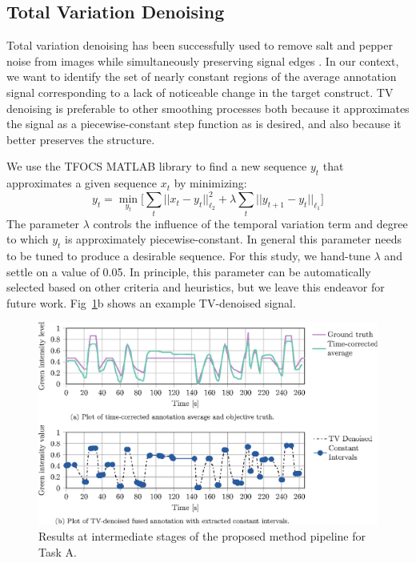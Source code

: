 \documentclass[10pt,letterpaper]{article}
\begin{document}
\subsection*{Total Variation Denoising}
Total variation denoising has been successfully used to remove salt and pepper noise from images while simultaneously preserving signal edges \cite{rudin1992nonlinear}.  In our context, we want to identify the set of nearly constant regions of the average annotation signal corresponding to a lack of noticeable change in the target construct.  TV denoising is preferable to other smoothing processes both because it approximates the signal as a piecewise-constant step function as is desired, and also because it better preserves the structure.

We use the TFOCS MATLAB library \cite{becker2011templates} to find a new sequence $y_t$ that approximates a given sequence $x_t$ by minimizing:
\begin{equation*}
y_t = \min_{y_t} \Big[\sum_{t} ||x_t - y_t||_{\ell_2}^2 + \lambda\sum_{t} ||y_{t+1} - y_{t}||_{\ell_1}\Big]
\end{equation*}
The parameter $\lambda$ controls the influence of the temporal variation term and degree to which $y_t$ is approximately piecewise-constant.  In general this parameter needs to be tuned to produce a desirable sequence.  For this study, we hand-tune $\lambda$ and settle on a value of 0.05.  In principle, this parameter can be automatically selected based on other criteria and heuristics, but we leave this endeavor for future work.  Fig~\ref{Fig:4}b shows an example TV-denoised signal.

\begin{figure}
    \begin{adjustwidth}{-2.25in}{0in}
	\centering
	\includegraphics{images/Fig4.eps}
	\caption{Results at intermediate stages of the proposed method pipeline for Task A.}
	\label{Fig:4}
	\end{adjustwidth}
\end{figure}
\end{document}
